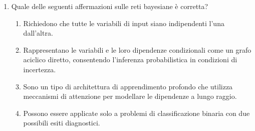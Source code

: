 \begin{enumerate}
    \item \label{ch3:q10} Quale delle seguenti affermazioni sulle reti bayesiane è corretta?
    \begin{enumerate}[label=\Alph*.]
        \item Richiedono che tutte le variabili di input siano indipendenti l'una dall'altra.
        \item Rappresentano le variabili e le loro dipendenze condizionali come un grafo aciclico diretto, consentendo l'inferenza probabilistica in condizioni di incertezza.
        \item Sono un tipo di architettura di apprendimento profondo che utilizza meccanismi di attenzione per modellare le dipendenze a lungo raggio.
        \item Possono essere applicate solo a problemi di classificazione binaria con due possibili esiti diagnostici.
    \end{enumerate}

\end{enumerate}


\begin{figure}[htbp]
  \centering
  
  \label{fig:mindmap_ch3}
\end{figure}